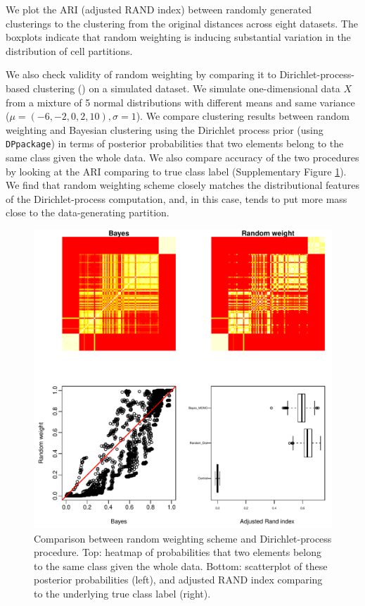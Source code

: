 \documentclass[aoas,preprint]{imsart}
\begin{document}
We plot the ARI (adjusted RAND index) between randomly generated clusterings 
to the clustering from the original distances across eight datasets. 
The boxplots indicate that random weighting is inducing
substantial variation in the distribution of cell partitions.

We also check validity of random weighting by comparing it to Dirichlet-process-based 
clustering (\cite{JSSv040i05})  on  a simulated dataset. 
We simulate one-dimensional data $X$ from a mixture of 5 normal distributions with different means and same variance ($\mu = (-6,-2,0,2,10), \sigma = 1$). 
We compare clustering results between random weighting and Bayesian clustering 
using the Dirichlet process prior (using  \verb+DPpackage+) 
in terms of posterior probabilities that two elements belong to the same class given the whole data. 
We also compare accuracy of the two procedures by looking at the ARI comparing to true class label (Supplementary Figure \ref{fig:simu}).  
We find that random weighting scheme closely matches the distributional features of the Dirichlet-process
computation, and, in this case, tends to put more mass close to the data-generating partition. 

\begin{figure}[h!]
\includegraphics[scale = 0.9]{Figs/try7-g.pdf}
 \caption{Comparison between random weighting scheme and Dirichlet-process procedure. 
 Top: heatmap of probabilities that two elements belong to the same class given the whole data. Bottom: scatterplot of these posterior probabilities (left), and adjusted RAND index comparing to the underlying true class label (right).}
  \label{fig:simu}
\end{figure}
\end{document}

